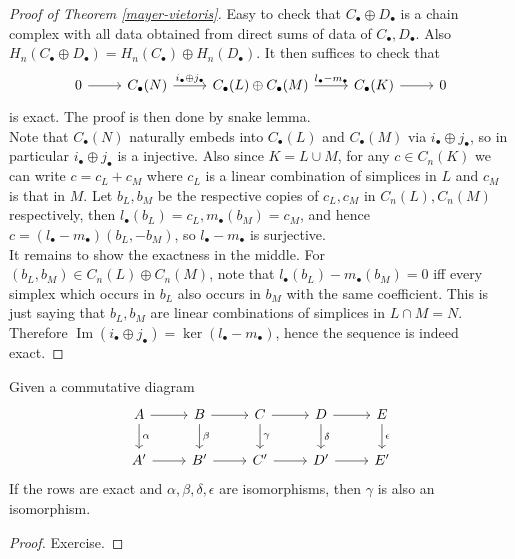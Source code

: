 \begin{proof}[Proof of Theorem \ref{mayer-vietoris}]
    Easy to check that $C_\bullet\oplus D_\bullet$ is a chain complex with all data obtained from direct sums of data of $C_\bullet,D_\bullet$.
    Also $H_n(C_\bullet\oplus D_\bullet)=H_n(C_\bullet)\oplus H_n(D_\bullet)$.
    It then suffices to check that
    \[
        \begin{tikzcd}
            0\arrow{r}&C_\bullet(N)\arrow{r}{i_\bullet\oplus j_\bullet}&C_\bullet(L)\oplus C_\bullet(M)\arrow{r}{l_\bullet-m_\bullet}&C_\bullet(K)\arrow{r}&0
        \end{tikzcd}
    \]
    is exact.
    The proof is then done by snake lemma.\\
    Note that $C_\bullet(N)$ naturally embeds into $C_\bullet (L)$ and $C_\bullet(M)$ via $i_\bullet\oplus j_\bullet$, so in particular $i_\bullet\oplus j_\bullet$ is a injective.
    Also since $K=L\cup M$, for any $c\in C_n(K)$ we can write $c=c_L+c_M$ where $c_L$ is a linear combination of simplices in $L$ and $c_M$ is that in $M$.
    Let $b_L,b_M$ be the respective copies of $c_L,c_M$ in $C_n(L),C_n(M)$ respectively, then $l_\bullet(b_L)=c_L,m_\bullet(b_M)=c_M$, and hence $c=(l_\bullet-m_\bullet)(b_L,-b_M)$, so $l_\bullet-m_\bullet$ is surjective.\\
    It remains to show the exactness in the middle.
    For $(b_L,b_M)\in C_n(L)\oplus C_n(M)$, note that $l_\bullet(b_L)-m_\bullet(b_M)=0$ iff every simplex which occurs in $b_L$ also occurs in $b_M$ with the same coefficient.
    This is just saying that $b_L,b_M$ are linear combinations of simplices in $L\cap M=N$.
    Therefore $\operatorname{Im}(i_\bullet\oplus j_\bullet)=\ker (l_\bullet-m_\bullet)$, hence the sequence is indeed exact.
\end{proof}
\begin{lemma}
    Given a commutative diagram
    \[
        \begin{tikzcd}
            A\arrow{r}\arrow{d}{\alpha}&B\arrow{r}\arrow{d}{\beta}&C\arrow{r}\arrow{d}{\gamma}&D\arrow{r}\arrow{d}{\delta}&E\arrow{d}{\epsilon}\\
            A'\arrow{r}&B'\arrow{r}&C'\arrow{r}&D'\arrow{r}&E'
        \end{tikzcd}
    \]
    If the rows are exact and $\alpha,\beta,\delta,\epsilon$ are isomorphisms, then $\gamma$ is also an isomorphism.
\end{lemma}
\begin{proof}
    Exercise.
\end{proof}
